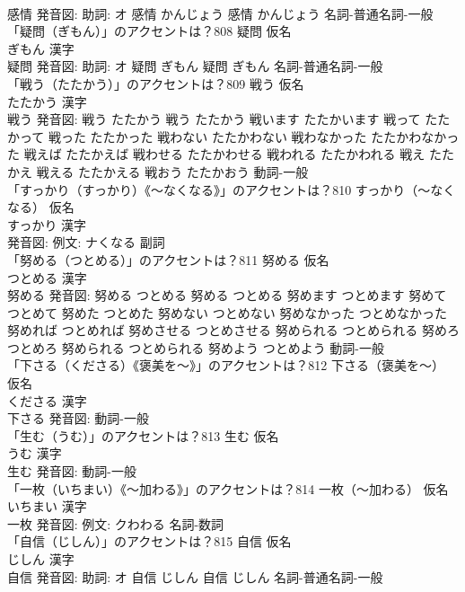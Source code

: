 \documentclass[8pt]{extreport}
\begin{document}
\begin{CJK}{UTF8}{min}
\\	感情 発音図: 助詞: オ	感情 かんじょう		感情 かんじょう				名詞-普通名詞-一般 
\\	「疑問（ぎもん）」のアクセントは？808	疑問 仮名　
\\	ぎもん 漢字　
\\	疑問 発音図: 助詞: オ	疑問 ぎもん		疑問 ぎもん				名詞-普通名詞-一般 
\\	「戦う（たたかう）」のアクセントは？809	戦う 仮名　
\\	たたかう 漢字　
\\	戦う 発音図:	戦う たたかう		戦う たたかう 戦います たたかいます 戦って たたかって 戦った たたかった 戦わない たたかわない 戦わなかった たたかわなかった 戦えば たたかえば 戦わせる たたかわせる 戦われる たたかわれる 戦え たたかえ 戦える たたかえる 戦おう たたかおう				動詞-一般 
\\	「すっかり（すっかり）《〜なくなる》」のアクセントは？810	すっかり（〜なくなる） 仮名　
\\	すっかり 漢字　
\\	発音図: 例文: ナくなる							副詞 
\\	「努める（つとめる）」のアクセントは？811	努める 仮名　
\\	つとめる 漢字　
\\	努める 発音図:	努める つとめる		努める つとめる 努めます つとめます 努めて つとめて 努めた つとめた 努めない つとめない 努めなかった つとめなかった 努めれば つとめれば 努めさせる つとめさせる 努められる つとめられる 努めろ つとめろ 努められる つとめられる 努めよう つとめよう				動詞-一般 
\\	「下さる（くださる）《褒美を〜》」のアクセントは？812	下さる（褒美を〜） 仮名　
\\	くださる 漢字　
\\	下さる 発音図:							動詞-一般 
\\	「生む（うむ）」のアクセントは？813	生む 仮名　
\\	うむ 漢字　
\\	生む 発音図:							動詞-一般 
\\	「一枚（いちまい）《〜加わる》」のアクセントは？814	一枚（〜加わる） 仮名　
\\	いちまい 漢字　
\\	一枚 発音図: 例文: クわわる							名詞-数詞 
\\	「自信（じしん）」のアクセントは？815	自信 仮名　
\\	じしん 漢字　
\\	自信 発音図: 助詞: オ	自信 じしん		自信 じしん				名詞-普通名詞-一般 

\end{CJK}
\end{document}

